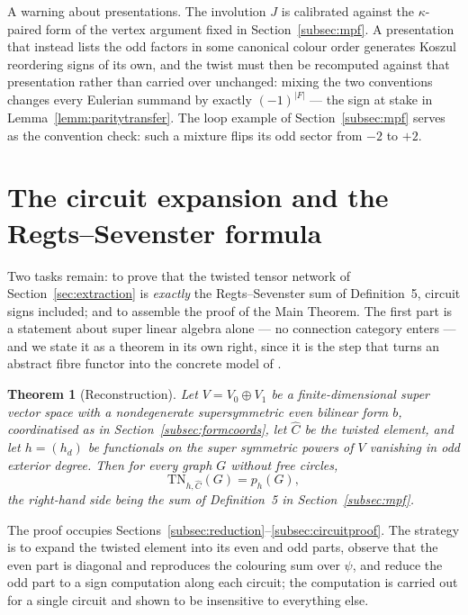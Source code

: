 \documentclass[11pt]{article}
\newtheorem{theo}{Theorem}[section]
\newcommand{\twistedC}{\widehat{C}}               %
\newcommand{\parinv}{J}                           %
\begin{document}
A warning about presentations. The involution $\parinv$ is
calibrated against the $\kappa$-paired form of the vertex
argument fixed in Section~\ref{subsec:mpf}. A presentation that
instead lists the odd factors in some canonical colour order
generates Koszul reordering signs of its own, and the twist must
then be recomputed against that presentation rather than carried
over unchanged: mixing the two conventions changes every Eulerian
summand by exactly $(-1)^{|F|}$ --- the sign at stake in
Lemma~\ref{lemm:paritytransfer}. The loop example of
Section~\ref{subsec:mpf} serves as the convention check: such a
mixture flips its odd sector from $-2$ to $+2$.

\section{The circuit expansion and the Regts--Sevenster
formula}\label{sec:circuit}

Two tasks remain: to prove that the twisted tensor network of
Section~\ref{sec:extraction} is \emph{exactly} the Regts--Sevenster
sum of Definition~5, circuit signs included; and to assemble the
proof of the Main Theorem. The first
part is a statement about super linear algebra alone --- no
connection category enters --- and we state it as a theorem in its
own right, since it is the step that turns an abstract fibre
functor into the concrete model of \cite{RS21}.

\begin{theo}[Reconstruction]\label{theo:reconstruction}
Let $V=V_{0}\oplus V_{1}$ be a finite-dimensional super vector
space with a nondegenerate supersymmetric even bilinear form $b$,
coordinatised as in Section~\ref{subsec:formcoords}, let
$\twistedC$ be the twisted element, and let $h=(h_{d})$ be
functionals on the super symmetric powers of $V$ vanishing in odd
exterior degree. Then for every graph $G$ without free circles,
\[
\mathrm{TN}_{h,\twistedC}(G)=p_{h}(G),
\]
the right-hand side being the sum of Definition~5 in
Section~\ref{subsec:mpf}.
\end{theo}

The proof occupies
Sections~\ref{subsec:reduction}--\ref{subsec:circuitproof}. The
strategy is to expand the twisted element into its even and odd
parts, observe that the even part is diagonal and reproduces the
colouring sum over $\psi$, and reduce the odd part to a sign
computation along each circuit; the computation is carried out for
a single circuit and shown to be insensitive to everything else.
\end{document}
